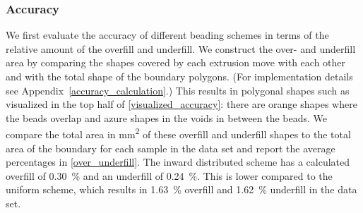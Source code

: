 \subsubsection{Accuracy}
We first evaluate the accuracy of different beading schemes in terms of the relative amount of the overfill and underfill. 
We construct the over- and underfill area by comparing the shapes covered by each extrusion move  with each other and with the total shape of the boundary polygons. (For implementation details see Appendix~\ref{accuracy_calculation}.)
This results in polygonal shapes such as visualized in the top half of \cref{visualized_accuracy}:
there are orange shapes where the beads overlap and azure shapes in the voids in between the beads.
%
%
We compare the total area in \si{\milli\meter\squared} of these overfill and underfill shapes to the total area of the boundary for each sample in the data set
and report the average percentages in \cref{over_underfill}.
The inward distributed scheme has a calculated overfill of {\SI{0.30}{\percent}} and an underfill of {\SI{0.24}{\percent}}.
This is lower compared to the uniform scheme, which results in {\SI{1.63}{\percent}} overfill and {\SI{1.62}{\percent}} underfill in the data set.

